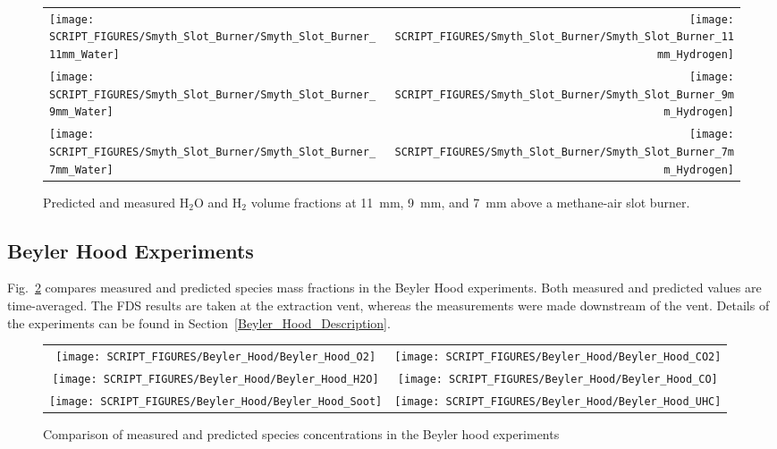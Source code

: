 \begin{figure}[p]
\begin{tabular*}{\textwidth}{l@{\extracolsep{\fill}}r}
\texttt{[image: SCRIPT\_FIGURES/Smyth\_Slot\_Burner/Smyth\_Slot\_Burner\_11mm\_Water]} &
\texttt{[image: SCRIPT\_FIGURES/Smyth\_Slot\_Burner/Smyth\_Slot\_Burner\_11mm\_Hydrogen]} \\
\texttt{[image: SCRIPT\_FIGURES/Smyth\_Slot\_Burner/Smyth\_Slot\_Burner\_9mm\_Water]} &
\texttt{[image: SCRIPT\_FIGURES/Smyth\_Slot\_Burner/Smyth\_Slot\_Burner\_9mm\_Hydrogen]} \\
\texttt{[image: SCRIPT\_FIGURES/Smyth\_Slot\_Burner/Smyth\_Slot\_Burner\_7mm\_Water]} &
\texttt{[image: SCRIPT\_FIGURES/Smyth\_Slot\_Burner/Smyth\_Slot\_Burner\_7mm\_Hydrogen]}
\end{tabular*}
\caption[H$_2$O and H$_2$ volume fractions at 11~mm, 9~mm, and 7~mm above burner, Smyth burner]
{Predicted and measured H$_2$O and H$_2$ volume fractions at 11~mm, 9~mm, and 7~mm above a methane-air slot burner.}
\label{Smyth_Slot_Burner_h2o_h2}
\end{figure}



\clearpage

\subsection{Beyler Hood Experiments}

Fig.~\ref{Beyler_Species} compares measured and predicted species mass fractions in the Beyler Hood experiments. Both measured and predicted values are time-averaged. The FDS results are taken at the extraction vent, whereas the measurements were made downstream of the vent. Details of the experiments can be found in Section~\ref{Beyler_Hood_Description}.



\begin{figure}[h]
\begin{tabular*}{\textwidth}{c@{\extracolsep{\fill}}c}
\texttt{[image: SCRIPT\_FIGURES/Beyler\_Hood/Beyler\_Hood\_O2]} &
\texttt{[image: SCRIPT\_FIGURES/Beyler\_Hood/Beyler\_Hood\_CO2]} \\
\texttt{[image: SCRIPT\_FIGURES/Beyler\_Hood/Beyler\_Hood\_H2O]} &
\texttt{[image: SCRIPT\_FIGURES/Beyler\_Hood/Beyler\_Hood\_CO]} \\
\texttt{[image: SCRIPT\_FIGURES/Beyler\_Hood/Beyler\_Hood\_Soot]} &
\texttt{[image: SCRIPT\_FIGURES/Beyler\_Hood/Beyler\_Hood\_UHC]}
\end{tabular*}
\caption[Summary of gas species predictions, Beyler hood experiments]
{Comparison of measured and predicted species concentrations in the Beyler hood experiments}
\label{Beyler_Species}
\end{figure}

